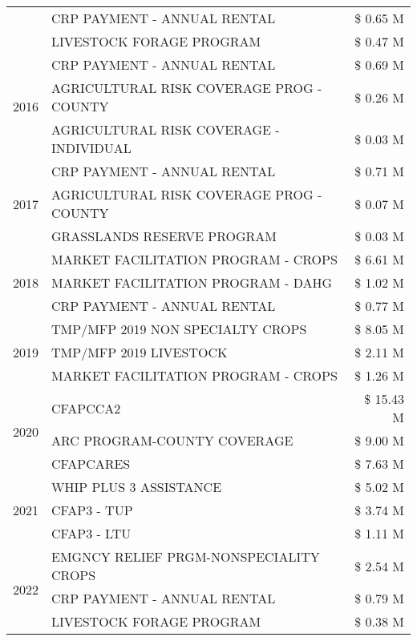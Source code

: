 \begin{tabular}{llr}
 & CRP PAYMENT - ANNUAL RENTAL & \$ 0.65 M \\
 & LIVESTOCK FORAGE PROGRAM & \$ 0.47 M \\
\cline{1-3}
\multirow[t]{3}{*}{2016} & CRP PAYMENT - ANNUAL RENTAL & \$ 0.69 M \\
 & AGRICULTURAL RISK COVERAGE PROG - COUNTY & \$ 0.26 M \\
 & AGRICULTURAL RISK COVERAGE - INDIVIDUAL & \$ 0.03 M \\
\cline{1-3}
\multirow[t]{3}{*}{2017} & CRP PAYMENT - ANNUAL RENTAL & \$ 0.71 M \\
 & AGRICULTURAL RISK COVERAGE PROG - COUNTY & \$ 0.07 M \\
 & GRASSLANDS RESERVE PROGRAM & \$ 0.03 M \\
\cline{1-3}
\multirow[t]{3}{*}{2018} & MARKET FACILITATION PROGRAM - CROPS & \$ 6.61 M \\
 & MARKET FACILITATION PROGRAM - DAHG & \$ 1.02 M \\
 & CRP PAYMENT - ANNUAL RENTAL & \$ 0.77 M \\
\cline{1-3}
\multirow[t]{3}{*}{2019} & TMP/MFP 2019 NON SPECIALTY CROPS & \$ 8.05 M \\
 & TMP/MFP 2019 LIVESTOCK & \$ 2.11 M \\
 & MARKET FACILITATION PROGRAM - CROPS & \$ 1.26 M \\
\cline{1-3}
\multirow[t]{3}{*}{2020} & CFAPCCA2 & \$ 15.43 M \\
 & ARC PROGRAM-COUNTY COVERAGE & \$ 9.00 M \\
 & CFAPCARES & \$ 7.63 M \\
\cline{1-3}
\multirow[t]{3}{*}{2021} & WHIP PLUS 3 ASSISTANCE & \$ 5.02 M \\
 & CFAP3 - TUP & \$ 3.74 M \\
 & CFAP3 - LTU & \$ 1.11 M \\
\cline{1-3}
\multirow[t]{3}{*}{2022} & EMGNCY RELIEF PRGM-NONSPECIALITY CROPS & \$ 2.54 M \\
 & CRP PAYMENT - ANNUAL RENTAL & \$ 0.79 M \\
 & LIVESTOCK FORAGE PROGRAM & \$ 0.38 M \\
\cline{1-3}
\bottomrule
\end{tabular}
